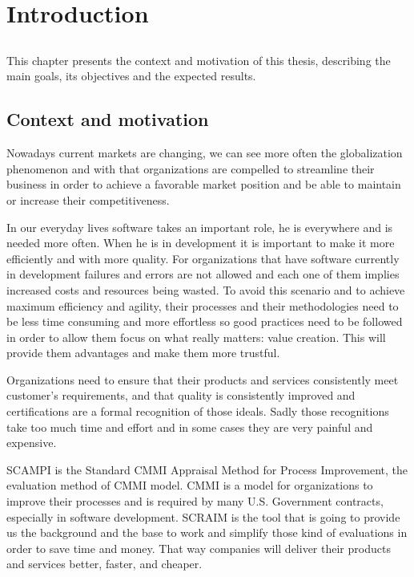 \chapter{Introduction} \label{chap:intro}

\section*{}

This chapter presents the context and motivation of this thesis, describing the main goals, its objectives and the expected results.

\section{Context and motivation} \label{sec:context}

Nowadays current markets are changing, we can see more often the globalization phenomenon and with that organizations are compelled to streamline their business in order to achieve a favorable market position and be able to maintain or increase their competitiveness.

In our everyday lives software takes an important role, he is everywhere and is needed more often. When he is in development it is important to make it more efficiently and with more quality. For organizations that have software currently in development failures and errors are not allowed and each one of them implies increased costs and resources being wasted. To avoid this scenario and to achieve maximum efficiency and agility, their processes and their methodologies need to be less time consuming and more effortless so good practices need to be followed in order to allow them focus on what really matters: value creation. This will provide them advantages and make them more trustful.

Organizations need to ensure that their products and services consistently meet customer’s requirements, and that quality is consistently improved and certifications are a formal recognition of those ideals. Sadly those recognitions take too much time and effort and in some cases they are very painful and expensive.

SCAMPI is the Standard CMMI Appraisal Method for Process Improvement, the evaluation method of CMMI model. CMMI is a model for organizations to improve their processes and is required by many U.S. Government contracts, especially in software development. SCRAIM is the tool that is going to provide us the background and the base to work and simplify those kind of evaluations in order to save time and money. That way companies will deliver their products and services better, faster, and cheaper. 

